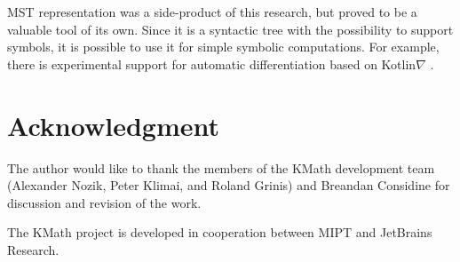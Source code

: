 \documentclass[conference]{IEEEtran}
\begin{document}
MST representation was a side-product of this research, but proved to be a valuable tool of its own. Since it is a syntactic tree with the possibility to support symbols, it is possible to use it for simple symbolic computations. For example, there is experimental support for automatic differentiation based on Kotlin$\nabla$ \cite{Considine2019KotlinAS}.

\section{Acknowledgment}

The author would like to thank the members of the KMath development team (Alexander Nozik, Peter Klimai, and Roland Grinis) and Breandan Considine for discussion and revision of the work.

The KMath project is developed in cooperation between MIPT and JetBrains Research.

\printbibliography
\end{document}
